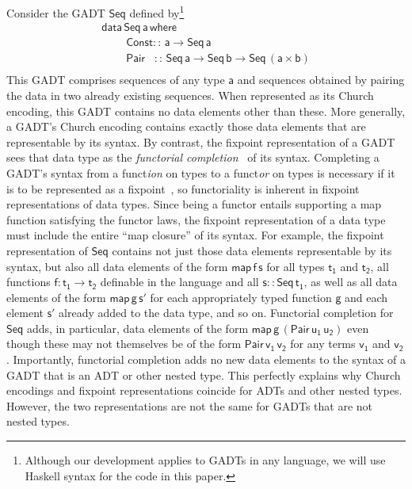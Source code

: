 \documentclass[submission,copyright,creativecommons]{eptcs}
\begin{document}
Consider the GADT $\mathsf{Seq}$ defined by\footnote{Although our
  development applies to GADTs in any language, we will use Haskell
  syntax for the code in this paper.}
\begin{equation}\label{eq:seq}
\begin{array}{l}
\mathsf{data\, Seq\,a\,where}\\
\mathsf{\;\;\;\;\;\;\;\;Const ::\, a \to Seq\,a}\\
\mathsf{\;\;\;\;\;\;\;\;Pair\,\,\,\,\, ::\, Seq \,a \to Seq\,b \to
  Seq\,(a \times b)}\\ 
\end{array}
\end{equation}
\noindent
This GADT comprises sequences of any type $\mathsf{a}$ and sequences
obtained by pairing the data in two already existing sequences. When
represented as its Church encoding, this GADT contains no data
elements other than these. More generally, a GADT's Church encoding
contains exactly those data elements that are representable by its
syntax. By contrast, the fixpoint representation of a GADT sees that
data type as the {\em functorial completion}~\cite{jp19} of its
syntax.  Completing a GADT's syntax from a funct{\em ion} on types to
a funct{\em or} on types is necessary if it is to be represented as a
fixpoint~\cite{tfca}, so functoriality is inherent in fixpoint
representations of data types. Since being a functor entails
supporting a map function satisfying the functor laws, the fixpoint
representation of a data type must include the entire ``map closure''
of its syntax.  For example, the fixpoint representation of
$\mathsf{Seq}$ contains not just those data elements representable by
its syntax, but also all data elements of the form
$\mathsf{map\,f\,s}$ for all types $\mathsf{t_1}$ and $\mathsf{t_2}$,
all functions $\mathsf{f : t_1 \to t_2}$ definable in the language and
all $\mathsf{s :: Seq\,t_1}$, as well as all data elements of the form
$\mathsf{map\,g\,s'}$ for each appropriately typed function
$\mathsf{g}$ and each element $\mathsf{s'}$ already added to the data
type, and so on. Functorial completion for $\mathsf{Seq}$ adds, in
particular, data elements of the form
$\mathsf{map\,g\,(Pair\,u_1\,u_2)}$ even though these may not
themselves be of the form $\mathsf{Pair\,v_1\,v_2}$ for any terms
$\mathsf{v_1}$ and $\mathsf{v_2}$. Importantly, functorial completion
adds no new data elements to the syntax of a GADT that is an ADT or
other nested type. This perfectly explains why Church encodings and
fixpoint representations coincide for ADTs and other nested
types. However, the two representations are not the same for GADTs
that are not nested types.
\end{document}
